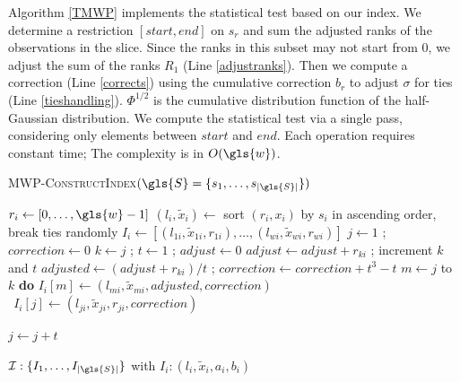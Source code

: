 Algorithm \ref{TMWP} implements the statistical test based on our index. We determine a restriction $[\mathit{start}, \mathit{end}]$ on $s_{r}$ and sum the adjusted ranks of the observations in the slice. 
Since the ranks in this subset may not start from $0$, we adjust the sum of the ranks $R_1$ (Line \ref{adjustranks}). Then we compute a correction (Line \ref{corrects}) using the cumulative correction $b_r$ to adjust $\sigma$ for ties (Line \ref{tieshandling}). $\Phi^{1/2}$ is the cumulative distribution function of the half-Gaussian distribution.  
We compute the statistical test via a single pass, considering only elements between $\mathit{start}$ and $\mathit{end}$. Each operation requires constant time; The complexity is in $O(\gls{w})$.

\begin{algorithm}[ht]\footnotesize
	\caption{ \textsc{\gls{MWP}-ConstructIndex}$(\gls{S} = \{s_1, \dots, s_{|\gls{S}|}\})$}\label{indexconstruction}
	\begin{algorithmic}[1]
		
		\State $r_i \gets \left[0,\dots,\gls{w}-1\right]$
		\State $(l_i,\tilde{x}_i) \gets$ sort $(r_i, x_i)$ by $s_i$ in ascending order, break ties randomly
		\State $I_i \gets \left[(l_{1i}, \tilde{x}_{1i}, r_{1i}),\dots,(l_{wi}, \tilde{x}_{wi}, r_{wi})\right]$ %
		\State $j \gets 1$ ; $\mathit{correction} \gets 0$
		\State $k \gets j$ ; $t \gets 1$ ; $\mathit{adjust} \gets 0$
		\State $\mathit{adjust} \gets \mathit{adjust} + r_{ki}$ ; increment $k$ and $t$
		\EndWhile
		\State $\mathit{adjusted} \gets (\mathit{adjust} + r_{ki}) / t$ ; $\mathit{correction} \gets \mathit{correction} + t^3 - t$ 
		 $m \gets j$ to $k$ {\bfseries do} $I_i[m] \gets (l_{mi}, \tilde{x}_{mi}, \mathit{adjusted}, \mathit{correction})$
		\EndIf
		 $~~I_i[j] \gets (l_{ji}, \tilde{x}_{ji}, r_{ji}, \mathit{correction})$
		
		\State $j \gets j + t$
		\EndWhile
		
		\EndFor
		 $\mathcal{I}: \{I_1, \dots, I_{|\gls{S}|} \}$ with $I_i: (l_i, \tilde{x}_i, a_i, b_i)$
	\end{algorithmic}
\end{algorithm}

